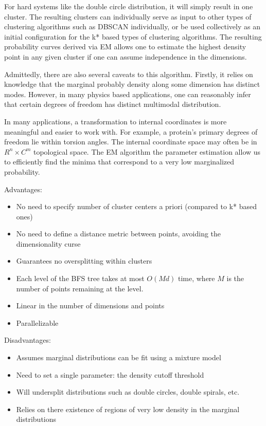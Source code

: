 \documentclass{acm_proc_article-sp}
\begin{document}
 For hard systems like the double circle distribution, it will simply result in one cluster. The resulting clusters can individually serve as input to other types of clustering algorithms such as DBSCAN individually, or be used collectively as an initial configuration for the k* based types of clustering algorithms. The resulting probability curves derived via EM allows one to estimate the highest density point in any given cluster if one can assume independence in the dimensions.
 
Admittedly, there are also several caveats to this algorithm. Firstly, it relies on knowledge that the marginal probably density along some dimension has distinct modes. However, in many physics based applications, one can reasonably infer that certain degrees of freedom has distinct multimodal distribution.

 In many applications, a transformation to internal coordinates is more meaningful and easier to work with. For example, a protein's primary degrees of freedom lie within torsion angles. The internal coordinate space may often be in \(R^n \times C^m\) topological space. The EM algorithm the parameter estimation allow us to efficiently find the minima that correspond to a very low marginalized probability.


Advantages:
\begin{itemize}
\item No need to specify number of cluster centers a priori (compared to k* based ones)
\item No need to define a distance metric between points, avoiding the dimensionality curse
\item Guarantees no oversplitting within clusters
\item Each level of the BFS tree takes at most $O(Md)$ time, where $M$ is the number of points remaining at the level.
\item Linear in the number of dimensions and points 
\item Parallelizable
\end{itemize}

Disadvantages:
\begin{itemize}
\item Assumes marginal distributions can be fit using a mixture model
\item Need to set a single parameter: the density cutoff threshold
\item Will undersplit distributions such as double circles, double spirals, etc.
\item Relies on there existence of regions of very low density in the marginal distributions
\end{itemize}
\end{document}
